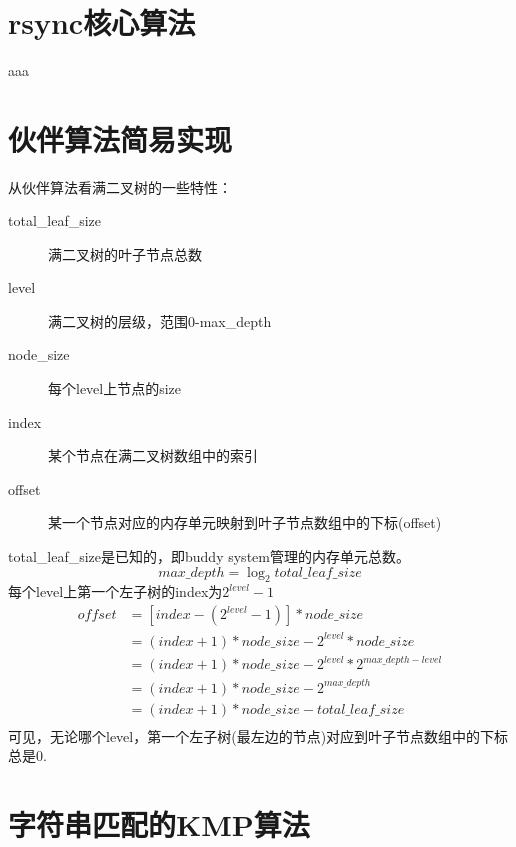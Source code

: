 ﻿\documentclass[a4paper,11pt]{article}
\begin{document}
  \tt %
  \pagestyle{header}
  \sybmaketitle
  \tableofcontents
  \newpage

  \pagestyle{main}
  \setcounter{page}{1}

  \section[rsync核心算法]{rsync核心算法}
  aaa

  \section[伙伴算法简易实现]{伙伴算法简易实现}
  \begin{center}
    
  \end{center}


  从伙伴算法看满二叉树的一些特性：
  \begin{description}
    \item[total\_leaf\_size] 满二叉树的叶子节点总数
    \item[level] 满二叉树的层级，范围0-max\_depth
    \item[node\_size] 每个level上节点的size
    \item[index] 某个节点在满二叉树数组中的索引
    \item[offset] 某一个节点对应的内存单元映射到叶子节点数组中的下标(offset)
  \end{description}
  total\_leaf\_size是已知的，即buddy system管理的内存单元总数。
  $$ max\_depth = \log_2total\_leaf\_size$$
  每个level上第一个左子树的index为$2^{level} - 1$
  \begin{align*}
    offset & = [index - (2^{level} - 1)] * node\_size \\
           & = (index + 1) * node\_size - 2^{level} * node\_size \\
           & = (index + 1) * node\_size - 2^{level} * 2^{max\_depth - level} \\
           & = (index + 1) * node\_size - 2^{max\_depth} \\
           & = (index + 1) * node\_size - total\_leaf\_size \\
  \end{align*}
  可见，无论哪个level，第一个左子树(最左边的节点)对应到叶子节点数组中的下标总是0.

  \section[字符串匹配的KMP算法]{字符串匹配的KMP算法}
\end{document}
